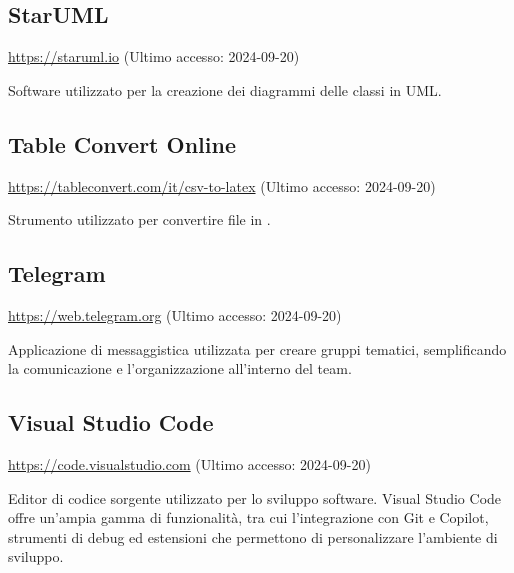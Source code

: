 \subsection{StarUML}
\par \href{https://staruml.io}{https://staruml.io} (Ultimo accesso: 2024-09-20)
\par Software utilizzato per la creazione dei diagrammi delle classi in UML.

\subsection{Table Convert Online}
\par \href{https://tableconvert.com/it/csv-to-latex}{https://tableconvert.com/it/csv-to-latex} (Ultimo accesso: 2024-09-20)
\par Strumento utilizzato per convertire file  in .

\subsection{Telegram}
\par \href{https://web.telegram.org}{https://web.telegram.org} (Ultimo accesso: 2024-09-20)
\par Applicazione di messaggistica utilizzata per creare gruppi tematici, semplificando la comunicazione e l'organizzazione all'interno del team.
    
\subsection{Visual Studio Code}
\par \href{https://code.visualstudio.com}{https://code.visualstudio.com} (Ultimo accesso: 2024-09-20)
\par Editor di codice sorgente utilizzato per lo sviluppo software. Visual Studio Code offre un’ampia gamma di funzionalità, tra cui l'integrazione con Git e Copilot, strumenti di debug ed estensioni che permettono di personalizzare l’ambiente di sviluppo.
